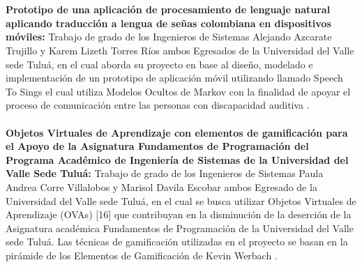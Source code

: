 \\
\\
\textbf{Prototipo de una aplicación de procesamiento de lenguaje natural aplicando traducción a lengua de señas colombiana en dispositivos móviles: }
Trabajo de grado de los Ingenieros de Sistemas Alejando Azcarate Trujillo y Karem Lizeth Torres Ríos ambos Egresados de la Universidad del Valle sede Tuluá, en el cual aborda su proyecto en base al diseño, modelado e implementación de un prototipo de aplicación móvil utilizando llamado Speech To Sings el cual utiliza Modelos Ocultos de Markov  con la finalidad de apoyar el proceso de comunicación entre las personas con discapacidad auditiva \cite{azcarate2020prototipo}.
\\
\\
\textbf{Objetos Virtuales de Aprendizaje con elementos de gamificación para el Apoyo de la Asignatura Fundamentos de Programación del Programa Académico de Ingeniería de Sistemas de la Universidad del Valle Sede Tuluá: }
Trabajo de grado de los Ingenieros de Sistemas Paula Andrea Corre Villalobos y Marisol Davila Escobar ambos Egresado de la Universidad del Valle sede Tuluá, en el cual se busca utilizar Objetos Virtuales de Aprendizaje (OVAs) [16] que contribuyan en la disminución de la deserción de la Asignatura académica Fundamentos de Programación de la Universidad del Valle sede Tuluá. Las técnicas de gamificación utilizadas en el proyecto se basan en la pirámide de los Elementos de Gamificación de Kevin Werbach \cite{correa2018objetos}.